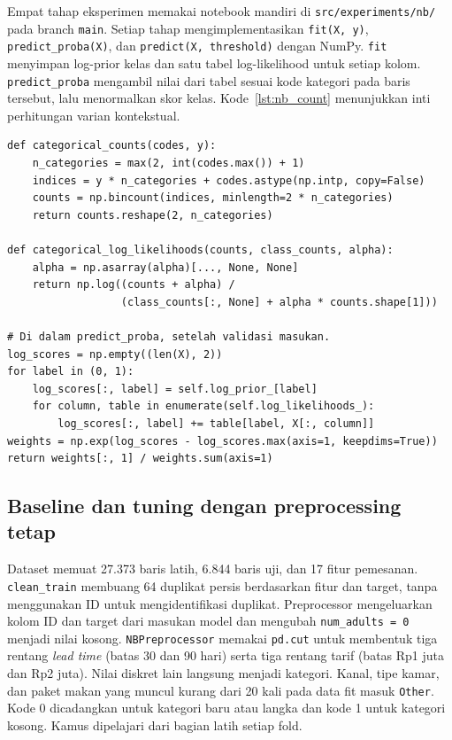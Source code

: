 Empat tahap eksperimen memakai notebook mandiri di \texttt{src/experiments/nb/} pada branch \texttt{main}. Setiap tahap mengimplementasikan \texttt{fit(X, y)}, \texttt{predict\_proba(X)}, dan \texttt{predict(X, threshold)} dengan NumPy. \texttt{fit} menyimpan log-prior kelas dan satu tabel log-likelihood untuk setiap kolom. \texttt{predict\_proba} mengambil nilai dari tabel sesuai kode kategori pada baris tersebut, lalu menormalkan skor kelas. Kode~\ref{lst:nb_count} menunjukkan inti perhitungan varian kontekstual.

\noindent\begin{minipage}{\textwidth}
\begin{lstlisting}[caption={Penghitungan log-likelihood dan skor Naive Bayes (cuplikan)},label={lst:nb_count}]
def categorical_counts(codes, y):
    n_categories = max(2, int(codes.max()) + 1)
    indices = y * n_categories + codes.astype(np.intp, copy=False)
    counts = np.bincount(indices, minlength=2 * n_categories)
    return counts.reshape(2, n_categories)

def categorical_log_likelihoods(counts, class_counts, alpha):
    alpha = np.asarray(alpha)[..., None, None]
    return np.log((counts + alpha) /
                  (class_counts[:, None] + alpha * counts.shape[1]))

# Di dalam predict_proba, setelah validasi masukan.
log_scores = np.empty((len(X), 2))
for label in (0, 1):
    log_scores[:, label] = self.log_prior_[label]
    for column, table in enumerate(self.log_likelihoods_):
        log_scores[:, label] += table[label, X[:, column]]
weights = np.exp(log_scores - log_scores.max(axis=1, keepdims=True))
return weights[:, 1] / weights.sum(axis=1)
\end{lstlisting}
\end{minipage}

\subsection{Baseline dan tuning dengan preprocessing tetap}
Dataset memuat 27.373 baris latih, 6.844 baris uji, dan 17 fitur pemesanan. \texttt{clean\_train} membuang 64 duplikat persis berdasarkan fitur dan target, tanpa menggunakan ID untuk mengidentifikasi duplikat. Preprocessor mengeluarkan kolom ID dan target dari masukan model dan mengubah \texttt{num\_adults = 0} menjadi nilai kosong. \texttt{NBPreprocessor} memakai \texttt{pd.cut} untuk membentuk tiga rentang \emph{lead time} (batas 30 dan 90 hari) serta tiga rentang tarif (batas Rp1 juta dan Rp2 juta). Nilai diskret lain langsung menjadi kategori. Kanal, tipe kamar, dan paket makan yang muncul kurang dari 20 kali pada data fit masuk \texttt{Other}. Kode 0 dicadangkan untuk kategori baru atau langka dan kode 1 untuk kategori kosong. Kamus dipelajari dari bagian latih setiap fold.

